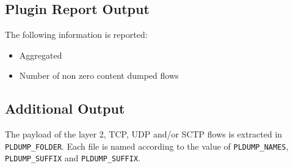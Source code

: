 \documentclass[documentation]{subfiles}
\begin{document}
\subsection{Plugin Report Output}
The following information is reported:
\begin{itemize}
    \item Aggregated {\tt{}}
    \item Number of non zero content dumped flows
\end{itemize}

\subsection{Additional Output}
The payload of the layer 2, TCP, UDP and/or SCTP flows is extracted in {\tt PLDUMP\_FOLDER}.
Each file is named according to the value of {\tt PLDUMP\_NAMES}, {\tt PLDUMP\_SUFFIX} and {\tt PLDUMP\_SUFFIX}.

%
\end{document}
